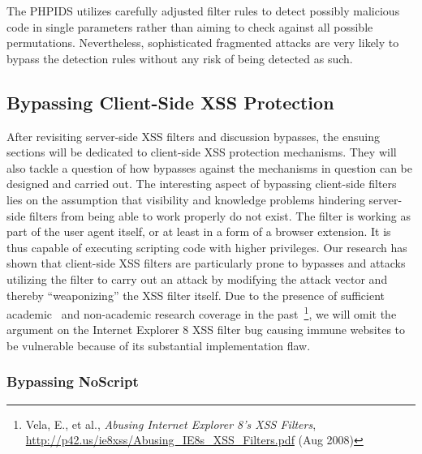       The PHPIDS utilizes carefully adjusted filter rules to detect possibly malicious code in single parameters rather than aiming to check against all possible permutations. Nevertheless, sophisticated fragmented attacks are very likely to bypass the detection rules without any risk of being detected as such. \\

    \subsection{Bypassing Client-Side XSS Protection}
    \label{subsubsec:5.4.7.bypassing_client_side_xss_protection}

      After revisiting server-side XSS filters and discussion bypasses, the ensuing sections will be dedicated to client-side XSS protection mechanisms. They will also tackle a question of how bypasses against the mechanisms in question can be designed and carried out. The interesting aspect of bypassing client-side filters lies on the assumption that visibility and knowledge problems hindering server-side filters from being able to work properly do not exist. The filter is working as part of the user agent itself, or at least in a form of a browser extension. It is thus capable of executing scripting code with higher privileges. Our research has shown that client-side XSS filters are particularly prone to bypasses and attacks utilizing the filter to carry out an attack by modifying the attack vector and thereby ``weaponizing'' the XSS filter itself. Due to the presence of sufficient academic~\cite{bates2010regular} and non-academic research coverage in the past~\footnote{Vela, E., et al., \textit{Abusing 
Internet Explorer 8's XSS Filters}, \url{http://p42.us/ie8xss/Abusing_IE8s_XSS_Filters.pdf} (Aug 2008)}, we will omit the argument on the Internet Explorer 8 XSS filter bug causing immune websites to be vulnerable because of its substantial implementation flaw. 
    
      \subsubsection{Bypassing NoScript}
      \label{5.4.7.1.bypassing_noscript}
      
